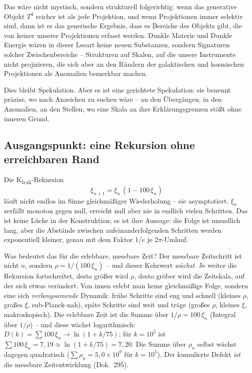 Das wäre nicht mystisch, sondern strukturell folgerichtig: wenn das generative
Objekt $T^4$ reicher ist als jede Projektion, und wenn Projektionen immer
selektiv sind, dann ist es das generische Ergebnis, dass es Bereiche des
Objekts gibt, die von keiner unserer Projektionen erfasst werden. Dunkle
Materie und Dunkle Energie wären in dieser Lesart keine neuen Substanzen,
sondern Signaturen solcher Zwischenbereiche -- Strukturen auf Skalen, auf die
unsere Instrumente nicht projizieren, die sich aber an den Rändern der
galaktischen und kosmischen Projektionen als Anomalien bemerkbar machen.

Dies bleibt Spekulation. Aber es ist eine gerichtete Spekulation: sie benennt
präzise, wo nach Anzeichen zu suchen wäre -- an den Übergängen, in den
Anomalien, an den Stellen, wo eine Skala an ihre Erklärungsgrenzen stößt
ohne inneren Grund.

\subsection*{Ausgangspunkt: eine Rekursion ohne erreichbaren Rand}

Die K\textsubscript{frak}-Rekursion
\begin{equation}
  \xi_{n+1} = \xi_n\,(1 - 100\,\xi_n)
\end{equation}
läuft nicht endlos im Sinne gleichmäßiger Wiederholung -- sie asymptotiert.
$\xi_n$ zerfällt monoton gegen null, erreicht null aber nie in endlich vielen
Schritten. Das ist keine Lücke in der Konstruktion; es ist ihre Aussage: die
Folge ist unendlich lang, aber die Abstände zwischen aufeinanderfolgenden
Schritten werden exponentiell kleiner, genau mit dem Faktor $1/e$ je
$2\pi$-Umlauf.

Was bedeutet das für die erlebbare, messbare Zeit? Der messbare Zeitschritt
ist nicht $n$, sondern $\rho = 1/(100\,\xi_n)$ -- und dieser Kehrwert
\emph{wächst}. Je weiter die Rekursion fortschreitet, desto größer wird
$\rho$, desto gröber wird die Zeitskala, auf der sich etwas verändert. Von
innen erlebt man keine gleichmäßige Folge, sondern eine sich
\emph{verlangsamende} Dynamik: frühe Schritte sind eng und schnell (kleines
$\rho$, großes $\xi$, sub-Planck-nah), späte Schritte sind weit und träge
(großes $\rho$, kleines $\xi$, makroskopisch). Die erlebbare Zeit ist die
Summe über $1/\rho = 100\,\xi_n$ (Integral über $1/\rho$) -- und diese wächst logarithmisch:
$D(k) = \sum 100\,\xi_n \to \ln(1 + k/75)$; für $k = 10^5$ ist
$\sum 100\,\xi_n = 7{,}19 \approx \ln(1+k/75) = 7{,}20$. Die Summe über $\rho_n$
selbst wächst dagegen quadratisch ($\sum\rho_n = 5{,}0\times10^9$ für
$k = 10^5$). Der kumulierte Defekt
\emph{ist} die messbare Zeitentwicklung (Dok.~295).

